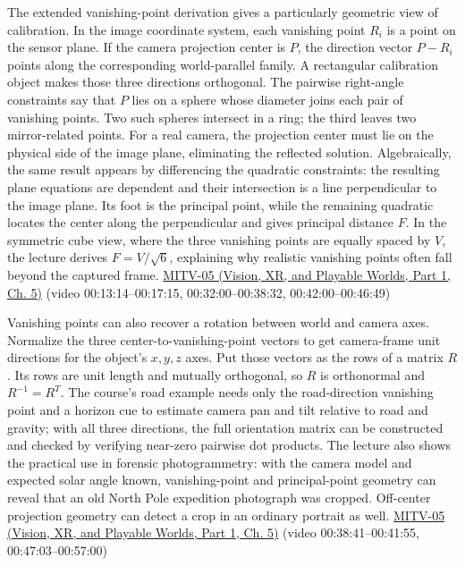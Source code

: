 The extended vanishing-point derivation gives a particularly geometric view of calibration. In the image coordinate system, each vanishing point \(R_i\) is a point on the sensor plane. If the camera projection center is \(P\), the direction vector \(P-R_i\) points along the corresponding world-parallel family. A rectangular calibration object makes those three directions orthogonal. The pairwise right-angle constraints say that \(P\) lies on a sphere whose diameter joins each pair of vanishing points. Two such spheres intersect in a ring; the third leaves two mirror-related points. For a real camera, the projection center must lie on the physical side of the image plane, eliminating the reflected solution. Algebraically, the same result appears by differencing the quadratic constraints: the resulting plane equations are dependent and their intersection is a line perpendicular to the image plane. Its foot is the principal point, while the remaining quadratic locates the center along the perpendicular and gives principal distance \(F\). In the symmetric cube view, where the three vanishing points are equally spaced by \(V\), the lecture derives \(F=V/\sqrt{6}\), explaining why realistic vanishing points often fall beyond the captured frame. \href{../07-Vision-XR-and-Playable-Worlds-P01/main.pdf\#nameddest=04-visual-computing-ii-ch036-mitv-05---tcc-and-for-montivision-demos-vanishing-point-use-of-vps-in-camera-calibration}{MITV-05 (Vision, XR, and Playable Worlds, Part 1, Ch. 5)} (video 00:13:14--00:17:15, 00:32:00--00:38:32, 00:42:00--00:46:49)

Vanishing points can also recover a rotation between world and camera axes. Normalize the three center-to-vanishing-point vectors to get camera-frame unit directions for the object's \(x,y,z\) axes. Put those vectors as the rows of a matrix \(R\). Its rows are unit length and mutually orthogonal, so \(R\) is orthonormal and \(R^{-1}=R^T\). The course's road example needs only the road-direction vanishing point and a horizon cue to estimate camera pan and tilt relative to road and gravity; with all three directions, the full orientation matrix can be constructed and checked by verifying near-zero pairwise dot products. The lecture also shows the practical use in forensic photogrammetry: with the camera model and expected solar angle known, vanishing-point and principal-point geometry can reveal that an old North Pole expedition photograph was cropped. Off-center projection geometry can detect a crop in an ordinary portrait as well. \href{../07-Vision-XR-and-Playable-Worlds-P01/main.pdf\#nameddest=04-visual-computing-ii-ch036-mitv-05---tcc-and-for-montivision-demos-vanishing-point-use-of-vps-in-camera-calibration}{MITV-05 (Vision, XR, and Playable Worlds, Part 1, Ch. 5)} (video 00:38:41--00:41:55, 00:47:03--00:57:00)

